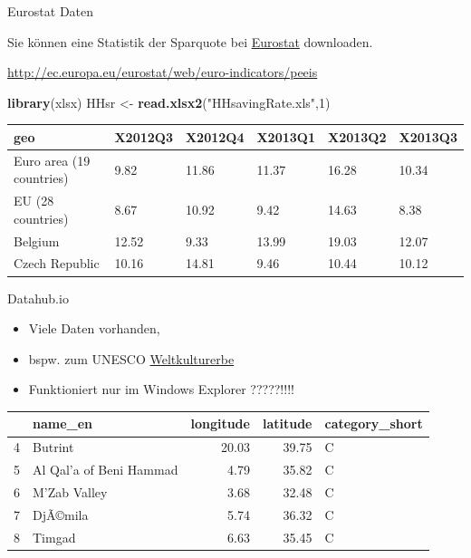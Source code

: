 \documentclass[ignorenonframetext,]{beamer}
\newenvironment{Shaded}{\begin{snugshade}}{\end{snugshade}}
\newcommand{\KeywordTok}[1]{\textcolor[rgb]{0.13,0.29,0.53}{\textbf{#1}}}
\newcommand{\DecValTok}[1]{\textcolor[rgb]{0.00,0.00,0.81}{#1}}
\newcommand{\StringTok}[1]{\textcolor[rgb]{0.31,0.60,0.02}{#1}}
\newcommand{\NormalTok}[1]{#1}
\providecommand{\tightlist}{%
  \setlength{\itemsep}{0pt}\setlength{\parskip}{0pt}}
\begin{document}
\begin{frame}[fragile]{Eurostat Daten}

Sie können eine Statistik der Sparquote bei
\href{http://ec.europa.eu/eurostat/web/euro-indicators/peeis}{Eurostat}
downloaden.

\url{http://ec.europa.eu/eurostat/web/euro-indicators/peeis}

\begin{Shaded}
\begin{Highlighting}[]
\KeywordTok{library}\NormalTok{(xlsx)}
\NormalTok{HHsr <-}\StringTok{ }\KeywordTok{read.xlsx2}\NormalTok{(}\StringTok{"HHsavingRate.xls"}\NormalTok{,}\DecValTok{1}\NormalTok{)}
\end{Highlighting}
\end{Shaded}

\begin{longtable}[]{@{}llllll@{}}
\toprule
geo & X2012Q3 & X2012Q4 & X2013Q1 & X2013Q2 & X2013Q3\tabularnewline
\midrule
\endhead
Euro area (19 countries) & 9.82 & 11.86 & 11.37 & 16.28 &
10.34\tabularnewline
EU (28 countries) & 8.67 & 10.92 & 9.42 & 14.63 & 8.38\tabularnewline
Belgium & 12.52 & 9.33 & 13.99 & 19.03 & 12.07\tabularnewline
Czech Republic & 10.16 & 14.81 & 9.46 & 10.44 & 10.12\tabularnewline
\bottomrule
\end{longtable}

\end{frame}

\begin{frame}{Datahub.io}

\begin{itemize}
\tightlist
\item
  Viele Daten vorhanden,
\item
  bspw. zum UNESCO
  \href{http://datahub.io/dataset/unesco-world-heritage-sites/resource/d4116195-44d8-4bc1-9f91-9b570870dc19}{Weltkulturerbe}
\item
  Funktioniert nur im Windows Explorer ?????!!!!
\end{itemize}

\begin{longtable}[]{@{}llrrl@{}}
\toprule
& name\_en & longitude & latitude & category\_short\tabularnewline
\midrule
\endhead
4 & Butrint & 20.03 & 39.75 & C\tabularnewline
5 & Al Qal'a of Beni Hammad & 4.79 & 35.82 & C\tabularnewline
6 & M'Zab Valley & 3.68 & 32.48 & C\tabularnewline
7 & DjÃ©mila & 5.74 & 36.32 & C\tabularnewline
8 & Timgad & 6.63 & 35.45 & C\tabularnewline
\bottomrule
\end{longtable}

\end{frame}
\end{document}
